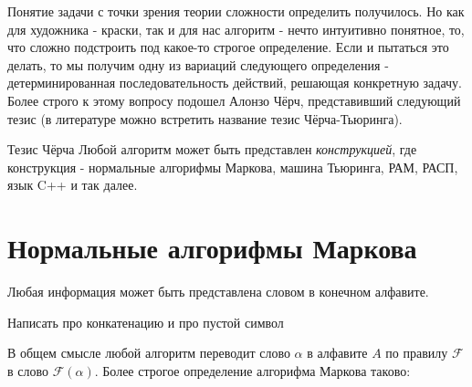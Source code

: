 \begin{abstract}
  Задача о кратчайшем пути в графе
  Задан граф $G = <V, E>$, где \(|E| = m\), \(W_1, ..., W_m\) - длины рёбер, \(a, b \in V\). Необходимо
  найти минимальный путь между вершинами \(a\) и \(b\).
  Форма: оптимизационная.
\end{abstract}

\begin{abstract}
  Задача об изоморфизме графов. 
  Задан графы $G = <V, E>$, $H = <P, Q>$. Изоморфны ли эти графы? 
  Форма: распознавание.
\end{abstract}

Понятие задачи с точки зрения теории сложности определить получилось. Но как для художника - краски,
так и для нас алгоритм - нечто интуитивно понятное, то, что сложно подстроить под какое-то строгое определение.
Если и пытаться это делать, то мы получим одну из вариаций следующего определения - детерминированная
последовательность действий, решающая конкретную задачу. Более строго к этому вопросу подошел Алонзо Чёрч,
представивший следующий тезис (в литературе можно встретить название тезис Чёрча-Тьюринга).

\begin{definition}
  Тезис Чёрча
  Любой алгоритм может быть представлен \textit{конструкцией},
  где конструкция - нормальные алгорифмы Маркова, машина Тьюринга, РАМ, РАСП, язык C++ и так далее.
\end{definition}

\section{Нормальные алгорифмы Маркова}

\begin{proposition}
  Любая информация может быть представлена словом в конечном алфавите.
\end{proposition}

Написать про конкатенацию и про пустой символ

В общем смысле любой алгоритм переводит слово \(\alpha\) в алфавите \(A\)
по правилу \(\mathcal{F}\) в слово \(\mathcal{F}(\alpha)\). Более строгое определение
алгорифма Маркова таково:

